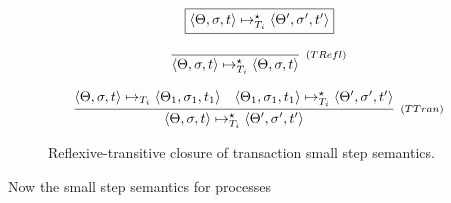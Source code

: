 \documentclass{jfp1}
\newcommand{\TStep}[9]{\ensuremath{\langle  #2, #3, #4 \rangle
    \mapsto_{T_{#5}} \langle  #7, #8, #9 \rangle}}
\newcommand{\TStepClos}[9]{\ensuremath{\langle #2, #3, #4 \rangle
    \mapsto^{\star}_{T_{#5}} \langle #7, #8, #9 \rangle}}
\begin{document}
     \begin{figure}[h]
       \[
            \begin{array}{c}
               \fbox{$\TStepClos{h}{\Theta}{\sigma}{t}{i}{h'}{\Theta'}{\sigma'}{t'}$}
               \\ \\
               \begin{array}{c}
                 \infer[_{(TRefl)}]
                          {\TStepClos{h}{\Theta}{\sigma}{t}{i}{h}{\Theta}{\sigma}{t}}{}
                          \\ \\
                 \infer[_{(TTran)}]
                          {\TStepClos{h}{\Theta}{\sigma}{t}{i}{h}{\Theta'}{\sigma'}{t'}}
                          {\TStep{h}{\Theta}{\sigma}{t}{i}{h}{\Theta_1}{\sigma_1}{t_1}
                           & 
                           \TStepClos{h}{\Theta_1}{\sigma_1}{t_1}{i}{h}{\Theta'}{\sigma'}{t'}}               
               \end{array}  
             \end{array}
       \]
       \centering
       \caption{Reflexive-transitive closure of transaction small step
       semantics.}
       \label{fig:clos-transaction}
     \end{figure}

     Now the small step semantics for processes
\end{document}
